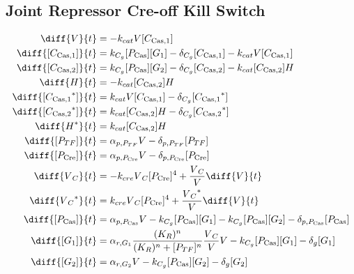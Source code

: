 \subsection{Joint Repressor Cre-off Kill Switch}
\label{s:Joint_Repressor_Cre_off_Kill_Switch}

\begin{align}
\diff{\vectorGen{}}{t} & = - \casCutRate{{}}\vectorGen{}\conc{\cplx{\cas}{1}}\\
\diff{\conc{\cplx{\cas}{1}}}{t} & =  \gRnaBind{}\conc{\proSp{\cas{}}}\conc{\gRna{1}} - \casCompDegradeRate{}\conc{\cplx{\cas}{1}} - \casCutRate{{}}\vectorGen{}\conc{\cplx{\cas}{1}}\\
\diff{\conc{\cplx{\cas}{2}}}{t} & =  \gRnaBind{}\conc{\proSp{\cas{}}}\conc{\gRna{2}} - \casCompDegradeRate{}\conc{\cplx{\cas}{2}} - \casCutRate{{}}\conc{\cplx{\cas}{2}}\hostGen{}\\
\diff{\hostGen{}}{t} & = - \casCutRate{{}}\conc{\cplx{\cas}{2}}\hostGen{}\\
\diff{\conc{\bound{\cplx{\cas}{1}}}}{t} & =  \casCutRate{{}}\vectorGen{}\conc{\cplx{\cas}{1}} - \casCompDegradeRate{}\conc{\bound{\cplx{\cas}{1}}}\\
\diff{\conc{\bound{\cplx{\cas}{2}}}}{t} & =  \casCutRate{{}}\conc{\cplx{\cas}{2}}\hostGen{} - \casCompDegradeRate{}\conc{\bound{\cplx{\cas}{2}}}\\
\diff{\edited{\hostGen{}}}{t} & =  \casCutRate{{}}\conc{\cplx{\cas}{2}}\hostGen{}\\
\diff{\conc{\proSp{TF}}}{t} & =  \txtlRate{\proSp{TF}}\vectorGen{} - \proDegradeRate{\proSp{TF}}\conc{\proSp{TF}}\\
\diff{\conc{\proSp{\cre{}}}}{t} & =  \txtlRate{\proSp{\cre{}}}\vectorGen{} - \proDegradeRate{\proSp{\cre{}}}\conc{\proSp{\cre{}}}\\
\diff{\vectorGen{}_C}{t} & = - \creCutRate{} \vectorGen{}_C \conc{\proSp{\cre{}}}^4 + \frac{\vectorGen{}_C}{\vectorGen{}} \diff{\vectorGen{}}{t}\\
\diff{\edited{\vectorGen{}_C}}{t} & =  \creCutRate{} \vectorGen{}_C \conc{\proSp{\cre{}}}^4 + \frac{\edited{\vectorGen{}_C}}{\vectorGen{}} \diff{\vectorGen{}}{t}\\
\diff{\conc{\proSp{\cas{}}}}{t} & =  \txtlRate{\proSp{\cas{}}}\vectorGen{} - \gRnaBind{}\conc{\proSp{\cas{}}}\conc{\gRna{1}} - \gRnaBind{}\conc{\proSp{\cas{}}}\conc{\gRna{2}} - \proDegradeRate{\proSp{\cas{}}}\conc{\proSp{\cas{}}}\\
\diff{\conc{\gRna{1}}}{t} & =  \txRate{\gRna{1}}\frac{(K_R)^n}{(K_R)^n + \conc{\proSp{TF}}^n}\frac{\vectorGen{}_C}{\vectorGen{}}\vectorGen{} - \gRnaBind{}\conc{\proSp{\cas{}}}\conc{\gRna{1}} - \rnaDegradeRate{}\conc{\gRna{1}}\\
\diff{\conc{\gRna{2}}}{t} & =  \txRate{\gRna{2}}\vectorGen{} - \gRnaBind{}\conc{\proSp{\cas{}}}\conc{\gRna{2}} - \rnaDegradeRate{}\conc{\gRna{2}}
\end{align}

